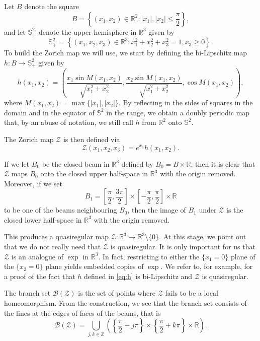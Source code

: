 \documentclass[11pt]{amsart}
\numberwithin{equation}{section}
\theoremstyle{definition}
\theoremstyle{definition}
\theoremstyle{definition}
\newcommand{\Z}{\mathbb{Z}}
\newcommand{\R}{\mathbb{R}}
\renewcommand{\S}{\mathbb{S}}
\begin{document}
Let $B$ denote the square 
\begin{equation}
\label{eq:B}    
B = \left \{ (x_1,x_2)\in \R^2 : |x_1|,|x_2| \leq \frac{\pi}{2} \right \} ,
\end{equation}
and let $\S^2_+$ denote the upper hemisphere in $\R^3$ given by
\[ \S^2_+ = \left \{ (x_1,x_2,x_3) \in \R^3 : x_1^2+x_2^2+x_3^2=1, x_3\geq 0 \right \}.\]
To build the Zorich map we will use, we start by defining the bi-Lipschitz map $h:B \to \S^2_+$ given by
\begin{equation}
    \label{eq:h}
h(x_1,x_2) = \left ( \frac{x_1 \sin M(x_1,x_2)}{\sqrt{x_1^2+x_2^2}} , \frac{x_2 \sin M(x_1,x_2)}{\sqrt{x_1^2+x_2^2}} , \cos M(x_1,x_2) \right ),
\end{equation} 
where $M(x_1,x_2) = \max \{ |x_1|,|x_2| \}$. By reflecting in the sides of squares in the domain and in the equator of $\S^2$ in the range, we obtain a doubly periodic map that, by an abuse of notation, we still call $h$ from $\R^2$ onto $\S^2$.

The Zorich map $\mathcal{Z}$ is then defined via
\begin{equation} 
\label{eq:Z}
\mathcal{Z} (x_1,x_2,x_3) = e^{x_3} h(x_1,x_2).
\end{equation}

If we let $B_0$ be the closed beam in $\R^3$ defined by $B_0 = B \times \R$, then it is clear that $\mathcal{Z}$ maps $B_0$ onto the closed upper half-space in $\R^3$ with the origin removed. Moreover, if we set 
\[ B_1 = \left [ \frac{\pi}{2} , \frac{3\pi}{2} \right ] \times \left [ -\frac{\pi}{2}, \frac{\pi}{2} \right ] \times \R \]
to be one of the beams neighbouring $B_0$, then the image of $B_1$ under $\mathcal{Z}$ is the closed lower half-space in $\R^3$ with the origin removed.

This produces a quasiregular map $\mathcal{Z} :\R^3 \to \R^3 \setminus \{ 0 \}$. At this stage, we point out that we do not really need that $\mathcal{Z}$ is quasiregular. It is only important for us that $\mathcal{Z}$ is an analogue of $\exp$ in $\R^3$. In fact, restricting to either the $\{x_1 = 0\}$ plane of the $\{x_2 = 0\}$ plane yields embedded copies of $\exp$. We refer to, for example, \cite[Appendix A2]{FlePra21} for a proof of the fact that $h$ defined in \eqref{eq:h} is bi-Lipschitz and $\mathcal{Z}$ is quasiregular. 

The branch set $\mathcal{B}(\mathcal{Z})$ is the set of points where $\mathcal{Z}$ fails to be a local homeomorphism. From the construction, we see that the branch set consists of the lines at the edges of faces of the beams, that is
\[ \mathcal{B}(\mathcal{Z}) = \bigcup_{ j,k \in \Z} \left ( \left \{ \frac{\pi}{2} + j\pi  \right \} \times \left \{ \frac{\pi}{2} + k\pi \right \} \times \R \right ) .\]
\end{document}

